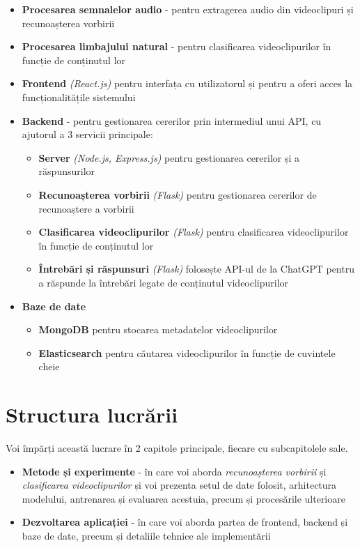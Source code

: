 \begin{itemize}
    \item \textbf{Procesarea semnalelor audio} - pentru extragerea audio din videoclipuri și recunoașterea vorbirii
    \item \textbf{Procesarea limbajului natural} - pentru clasificarea videoclipurilor în funcție de conținutul lor
    \item \textbf{Frontend} \textit{(React.js)} pentru interfața cu utilizatorul și pentru a oferi acces la funcționalitățile sistemului
    \item \textbf{Backend} - pentru gestionarea cererilor prin intermediul unui API, cu ajutorul a 3 servicii principale:
    \begin{itemize}
        \item \textbf{Server} \textit{(Node.js, Express.js)} pentru gestionarea cererilor și a răspunsurilor
        \item \textbf{Recunoașterea vorbirii} \textit{(Flask)} pentru gestionarea cererilor de recunoaștere a vorbirii
        \item \textbf{Clasificarea videoclipurilor} \textit{(Flask)} pentru clasificarea videoclipurilor în funcție de conținutul lor
        \item \textbf{Întrebări și răspunsuri} \textit{(Flask)} folosește API-ul de la ChatGPT pentru a răspunde la întrebări
        legate de conținutul videoclipurilor
    \end{itemize}
    \item \textbf{Baze de date} 
    \begin{itemize}
        \item \textbf{MongoDB} pentru stocarea metadatelor videoclipurilor
        \item \textbf{Elasticsearch} pentru căutarea videoclipurilor în funcție de cuvintele cheie
    \end{itemize}
\end{itemize}


\section{Structura lucrării}

Voi împărți această lucrare în 2 capitole principale, fiecare cu subcapitolele sale.

\begin{itemize}
    \item \textbf{Metode și experimente} - în care voi aborda \textit{recunoașterea vorbirii} și 
    \textit{clasificarea videoclipurilor} și voi prezenta setul de date folosit, arhitectura modelului,
    antrenarea și evaluarea acestuia, precum și procesările ulterioare
    \item \textbf{Dezvoltarea aplicației} - în care voi aborda partea de frontend, backend și baze de date,
    precum și detaliile tehnice ale implementării
\end{itemize}